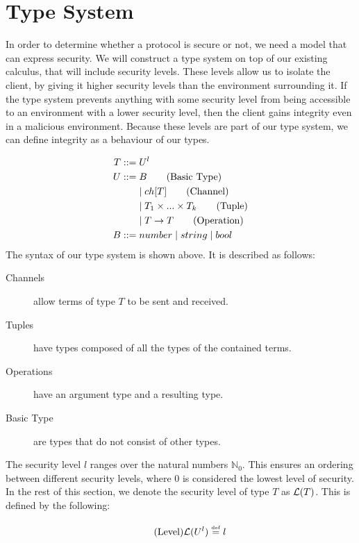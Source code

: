 \section{Type System}\label{ch:type-security}
In order to determine whether a protocol is secure or not, we need a model that can express security.
We will construct a type system on top of our existing calculus, that will include security levels.
These levels allow us to isolate the client, by giving it higher security levels than the environment surrounding it.
If the type system prevents anything with some security level from being accessible to an environment with a lower security level, then the client gains integrity even in a malicious environment.
Because these levels are part of our type system, we can define integrity as a behaviour of our types.

\begin{align*}
    T::=&\;U^l\\    	
    U::=&\;B \tag{Basic Type}\\
        &\mid ch[T] \tag{Channel}\\
        &\mid T_1 \times...\times T_k \tag{Tuple}\\
        &\mid T\rightarrow T \tag{Operation}\\
    B::=&\;number 
        \mid string
        \mid bool\\
\end{align*}
The syntax of our type system is shown above. It is described as follows:

\begin{description}
    \item[Channels] allow terms of type $T$ to be sent and received.
    \item[Tuples] have types composed of all the types of the contained terms.
    \item[Operations] have an argument type and a resulting type.
    \item[Basic Type] are types that do not consist of other types.
\end{description}

The security level $l$ ranges over the natural numbers $\mathbb{N}_0$.
This ensures an ordering between different security levels, where $0$ is considered the lowest level of security.
In the rest of this section, we denote the security level of type $T$ as $\mathcal{L}(T)$.
This is defined by the following:

\begin{align*}
    \tag{Level}\mathcal{L}(U^l)\overset{\underset{\mathrm{def}}{}}{=} l
\end{align*}

